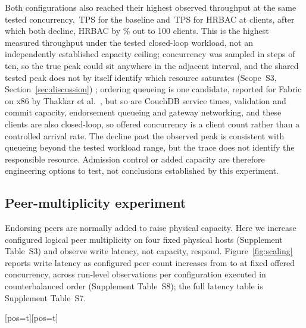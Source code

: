 \documentclass[a4paper,fleqn]{cas-dc}
\makeatletter
\newenvironment{widefig}[1][pos=t]
  {\ifdoublecol \@nameuse{figure*}[#1]\else \@nameuse{figure}[#1]\fi}
  {\ifdoublecol \@nameuse{endfigure*}\else \@nameuse{endfigure}\fi}
\makeatother
\begin{document}
Both configurations also reached their highest observed throughput at the
same tested concurrency, \PeakBaselineTPS\,TPS for the baseline and
\PeakHrbacTPS\,TPS for HRBAC at \KneeClients{} clients, after which both
decline, HRBAC by \PostKneeDeclinePct\% out to 100 clients. This is the
highest measured throughput under the tested closed-loop workload, not an
independently established capacity ceiling; concurrency was sampled in
steps of ten, so the true peak could sit anywhere in the adjacent
interval, and the shared tested peak does not by itself identify which
resource saturates (Scope~S3, Section~\ref{sec:discussion}) ;
ordering queueing is one candidate, reported for Fabric on x86 by
Thakkar et al.~\cite{thakkar2018performance}, but so are CouchDB service
times, validation and commit capacity, endorsement queueing and gateway
networking, and these clients are also closed-loop, so offered
concurrency is a client count rather than a controlled arrival rate. The
decline past the observed peak is consistent with queueing beyond the
tested workload range, but the trace does not identify the responsible
resource. Admission control or added capacity are therefore engineering
options to test, not conclusions established by this experiment.

\subsection{Peer-multiplicity experiment}
\label{subsec:scaling}

Endorsing peers are normally added to raise physical capacity. Here we
increase configured logical peer multiplicity on four fixed physical
hosts (Supplement Table~S3) and observe write latency, not capacity,
respond. Figure~\ref{fig:scaling} reports write latency as configured peer
count increases from \ScaleMinPeers{} to \ScaleMaxPeers{} at fixed offered
concurrency, across \PartRunsPerConfig{} run-level observations per
configuration executed in counterbalanced order (Supplement Table~S8); the
full latency table is Supplement Table~S7.

\begin{widefig}
\centering
{}
\caption{Run-level write latency and 95\% confidence intervals by configured logical peer count.}
\label{fig:scaling}
\end{widefig}
\end{document}
